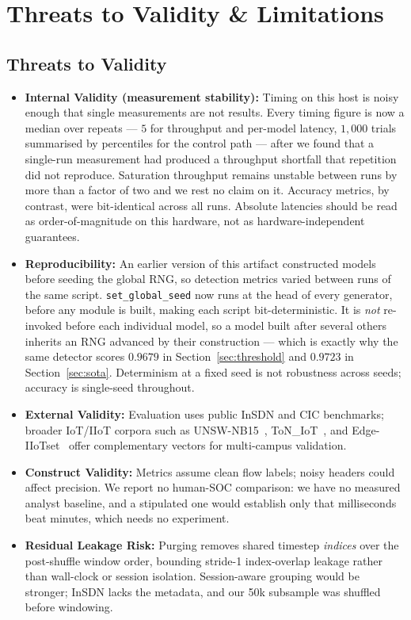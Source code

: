 \documentclass[conference,a4paper]{IEEEtran}
\begin{document}
\section{Threats to Validity \& Limitations}
\subsection{Threats to Validity}
\label{sec:validity}
\begin{itemize}
    \item \textbf{Internal Validity (measurement stability):} Timing on this host is noisy enough that single measurements are not results. Every timing figure is now a median over repeats --- $5$ for throughput and per-model latency, $1{,}000$ trials summarised by percentiles for the control path --- after we found that a single-run measurement had produced a throughput shortfall that repetition did not reproduce. Saturation throughput remains unstable between runs by more than a factor of two and we rest no claim on it. Accuracy metrics, by contrast, were bit-identical across all runs. Absolute latencies should be read as order-of-magnitude on this hardware, not as hardware-independent guarantees.
    \item \textbf{Reproducibility:} An earlier version of this artifact constructed models before seeding the global RNG, so detection metrics varied between runs of the same script. \texttt{set\_global\_seed} now runs at the head of every generator, before any module is built, making each script bit-deterministic. It is \emph{not} re-invoked before each individual model, so a model built after several others inherits an RNG advanced by their construction --- which is exactly why the same detector scores $0.9679$ in Section~\ref{sec:threshold} and $0.9723$ in Section~\ref{sec:sota}. Determinism at a fixed seed is not robustness across seeds; accuracy is single-seed throughout.
    \item \textbf{External Validity:} Evaluation uses public InSDN and CIC benchmarks; broader IoT/IIoT corpora such as UNSW-NB15~\cite{b6}, ToN\_IoT~\cite{b7}, and Edge-IIoTset~\cite{b8} offer complementary vectors for multi-campus validation.
    \item \textbf{Construct Validity:} Metrics assume clean flow labels; noisy headers could affect precision. We report no human-SOC comparison: we have no measured analyst baseline, and a stipulated one would establish only that milliseconds beat minutes, which needs no experiment.
    \item \textbf{Residual Leakage Risk:} Purging removes shared timestep \emph{indices} over the post-shuffle window order, bounding stride-1 index-overlap leakage rather than wall-clock or session isolation. Session-aware grouping would be stronger; InSDN lacks the metadata, and our 50k subsample was shuffled before windowing.
\end{itemize}
\end{document}
